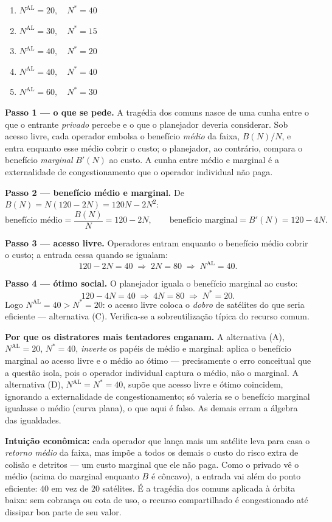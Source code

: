 \begin{enumerate}[label=\Alph*., leftmargin=3.2em, itemsep=0.15em, topsep=0.2em]
  \item $N^{\text{AL}}=20,\quad N^{*}=40$
  \item $N^{\text{AL}}=30,\quad N^{*}=15$
  \item $N^{\text{AL}}=40,\quad N^{*}=20$
  \item $N^{\text{AL}}=40,\quad N^{*}=40$
  \item $N^{\text{AL}}=60,\quad N^{*}=30$
\end{enumerate}
\begin{solucao}
\textbf{Passo 1 --- o que se pede.} A tragédia dos comuns nasce de uma cunha entre o que o entrante \emph{privado} percebe e o que o planejador deveria considerar. Sob acesso livre, cada operador embolsa o benefício \emph{médio} da faixa, $B(N)/N$, e entra enquanto esse médio cobrir o custo; o planejador, ao contrário, compara o benefício \emph{marginal} $B'(N)$ ao custo. A cunha entre médio e marginal é a externalidade de congestionamento que o operador individual não paga.

\textbf{Passo 2 --- benefício médio e marginal.} De $B(N)=N(120-2N)=120N-2N^2$:
\[
\text{benefício médio}=\frac{B(N)}{N}=120-2N,\qquad \text{benefício marginal}=B'(N)=120-4N.
\]

\textbf{Passo 3 --- acesso livre.} Operadores entram enquanto o benefício médio cobrir o custo; a entrada cessa quando se igualam:
\[
120-2N=40\;\Longrightarrow\;2N=80\;\Longrightarrow\; N^{\text{AL}}=40.
\]

\textbf{Passo 4 --- ótimo social.} O planejador iguala o benefício marginal ao custo:
\[
120-4N=40\;\Longrightarrow\;4N=80\;\Longrightarrow\; N^{*}=20.
\]
Logo $N^{\text{AL}}=40>N^{*}=20$: o acesso livre coloca o \emph{dobro} de satélites do que seria eficiente --- alternativa (C). Verifica-se a sobreutilização típica do recurso comum.

\textbf{Por que os distratores mais tentadores enganam.} A alternativa (A), $N^{\text{AL}}=20,\,N^{*}=40$, \emph{inverte} os papéis de médio e marginal: aplica o benefício marginal ao acesso livre e o médio ao ótimo --- precisamente o erro conceitual que a questão isola, pois o operador individual captura o médio, não o marginal. A alternativa (D), $N^{\text{AL}}=N^{*}=40$, supõe que acesso livre e ótimo coincidem, ignorando a externalidade de congestionamento; só valeria se o benefício marginal igualasse o médio (curva plana), o que aqui é falso. As demais erram a álgebra das igualdades.

\textbf{Intuição econômica:} cada operador que lança mais um satélite leva para casa o \emph{retorno médio} da faixa, mas impõe a todos os demais o custo do risco extra de colisão e detritos --- um custo marginal que ele não paga. Como o privado vê o médio (acima do marginal enquanto $B$ é côncavo), a entrada vai além do ponto eficiente: $40$ em vez de $20$ satélites. É a tragédia dos comuns aplicada à órbita baixa: sem cobrança ou cota de uso, o recurso compartilhado é congestionado até dissipar boa parte de seu valor.
\end{solucao}

